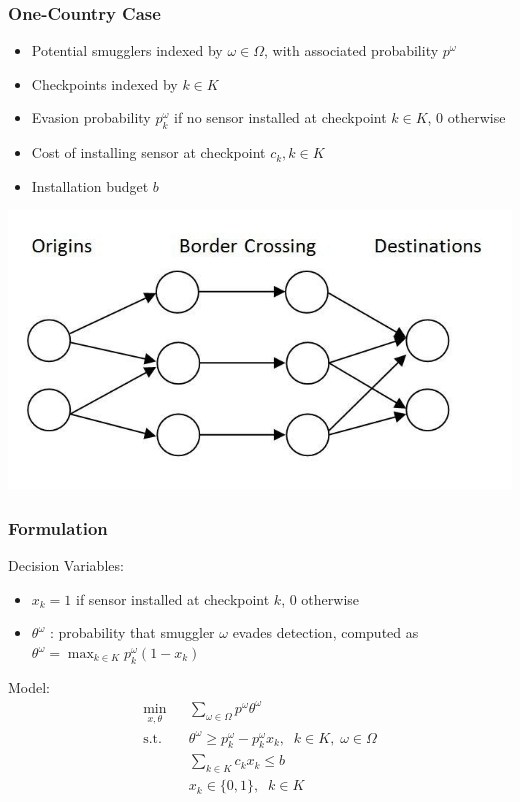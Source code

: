 \documentclass[12pt,handout]{beamer}
\begin{document}
\begin{frame}
\frametitle{One-Country Case}
\begin{itemize}
\item Potential smugglers indexed by $\omega \in \Omega$, with associated probability $p^\omega$
\item Checkpoints indexed by $k \in K$
\item Evasion probability $p_k^\omega$ if no sensor installed at checkpoint $k \in K$, 0 otherwise
\item Cost of installing sensor at checkpoint $c_k, k \in K$
\item Installation budget $b$
\end{itemize}
\begin{center}
\includegraphics[scale=0.3]{one_country.jpg}
\end{center}
\end{frame}

\begin{frame}
\frametitle{Formulation}
Decision Variables:
\begin{itemize}
\item $x_k = 1$ if sensor installed at checkpoint $k$, 0 otherwise
\item $\theta^\omega$ : probability that smuggler $\omega$ evades detection, computed as $\theta^\omega = \max_{k \in K} p_k^\omega (1 - x_k)$
\end{itemize}
Model:
\begin{eqnarray}
\min_{x, \theta} && \sum_{\omega \in \Omega} p^\omega \theta^\omega \nonumber \\
\mbox{s.t.} && \theta^\omega \ge p_k^\omega - p_k^\omega x_k,\;\;k \in K,\;\omega \in \Omega \nonumber \\
&& \sum_{k \in K} c_k x_k \le b \nonumber \\
&& x_k \in \{0,1\},\;\;k \in K \nonumber
\end{eqnarray}
\end{frame}
\end{document}
